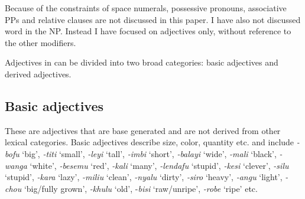 \documentclass[output=paper,
modfonts
]{langscibook}
\begin{document}

Because of the constraints of space numerals, possessive pronouns, associative PPs and relative clauses are not discussed in this paper. I have also not discussed word in the NP. Instead I have focused on adjectives only, without reference to the other  modifiers.

Adjectives in  can be divided into two broad categories: basic adjectives and derived adjectives.

\subsection{Basic adjectives}

These are adjectives that are base generated and are not derived from other lexical categories. Basic adjectives describe size, color, quantity etc. and include \textit{-bofu }‘big’,\textit{ -titi} ‘small’, \textit{-leyi} ‘tall’, \textit{-imbi} ‘short’, \textit{-balayi} ‘wide’, \textit{-mali} ‘black’, \textit{-wanga} ‘white’, \textit{-besemu} ‘red’, \textit{-kali} ‘many’, \textit{-lendafu} ‘stupid’, \textit{-kesi} ‘clever’, \textit{-silu} ‘stupid’, \textit{-kara} ‘lazy’, \textit{-miliu} ‘clean’, \mbox{\textit{-nyalu}} ‘dirty’, \textit{-siro} ‘heavy’, \textit{-angu} ‘light’, \textit{-chou} ‘big/fully grown’, \textit{-khulu} ‘old’, -\textit{bisi} ‘raw/\linebreak unripe’, \textit{-robe} ‘ripe’ etc. 
\end{document}
